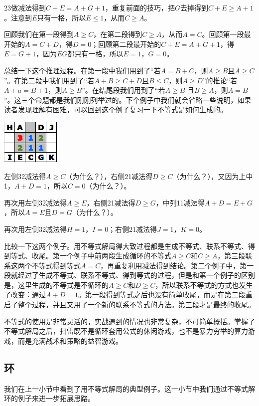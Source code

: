23做减法得到$C+E=A+G+1$，重复前面的技巧，把$G$去掉得到$C+E\ge A+1$。注意到$E$只有一格，所以$E\le 1$，从而$C\ge A$。

回顾我们在第一段得到$A\ge C$，在第二段得到$C\ge A$，从而$A=C$。回顾第一段最开始的$A=C+D$，得$D=0$；回顾第二段最开始的$C+E=A+G+1$，得$E=G+1$，因为$EG$都只有一格，所以$E=1$，$G=0$。

总结一下这个推理过程。在第一段中我们用到了“若$A=B+C$，则$A\ge B$且$A\ge C$”。在第二段中我们用到了“若$A+B\ge C+D$且$B\le C$，则$A\ge D$”的推论“若$A+a=B+1$，则$A\ge B$”。在结尾段我们用到了“若$A\ge B$ 且$B\ge A$，则$A=B$”。这三个命题都是我们刚刚列举过的。下个例子中我们就会省略一些说明，如果读者发现理解有困难，可以回到这个例子复习一下不等式是如何生成的。

\vspace{5mm}
\begin{center}
    \includegraphics{trick/不等式2.png}
\end{center}
左侧32减法得$A\ge C$（为什么？），右侧21减法得$D\ge C$（为什么？），又因为上中1，$A+D=1$，所以$C=0$（为什么？）。

再次用左侧32减法得$A\ge E$，右侧21减法得$D\ge G$，中列11减法得$A+D=E+G$，所以$A=E$且$D=G$（为什么？）。

再次用左侧32减法得$H=1$，$I=0$；右侧21减法得$J=1$，$K=0$。

\vspace{5mm}比较一下这两个例子。用不等式解局得大致过程都是生成不等式、联系不等式、得到等式、收尾。第一个例子中前两段生成循环的不等式$A\ge C$和$C\ge A$，第三段联系这两个不等式得到等式$A=C$，再重复利用减法得到结论。第二个例子中，第一段就经过了生成不等式、联系不等式、得到等式的过程，但是和第一个例子的区别是，这里生成的不等式是不循环的$A\ge C$和$D\ge C$，所以联系不等式的方式也发生了改变：通过$A+D=1$。第一段得到等式之后也没有简单收尾，而是在第二段重启了整个过程，并且又用了一个新的联系不等式的方法。第三段才是最终的收尾。

不等式的使用是非常灵活的，实战遇到的情况也非常复杂，不可简单概括。掌握了不等式解局之后，扫雷既不是循环套用公式的休闲游戏，也不是暴力穷举的算力游戏，而是充满战术和策略的益智游戏。

\subsection{环}
我们在上一小节中看到了用不等式解局的典型例子。这一小节中我们通过不等式解环的例子来进一步拓展思路。

